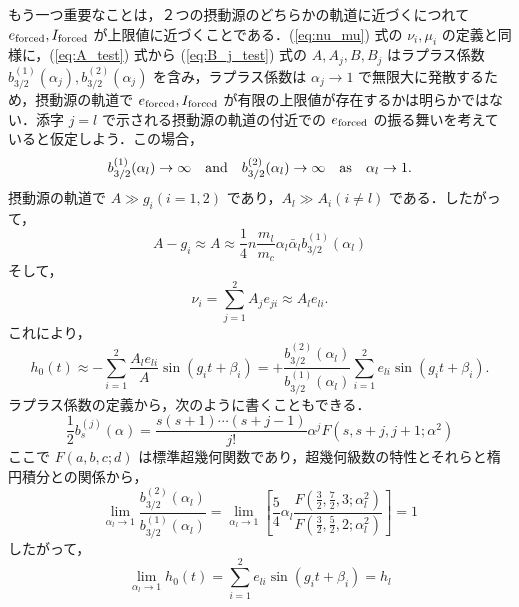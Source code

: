 \documentclass[11pt,a4paper,oneside,onecolumn]{jarticle}
\begin{document}
もう一つ重要なことは，２つの摂動源のどちらかの軌道に近づくにつれて $e_{\rm forced}, I_{\rm forced}$ が上限値に近づくことである．(\ref{eq:nu_mu}) 式の $\nu_i, \mu_i$ の定義と同様に，(\ref{eq:A_test}) 式から (\ref{eq:B_j_test}) 式の $A, A_j, B, B_j$ はラプラス係数 $b_{3/2}^{(1)} (\alpha_j), b_{3/2}^{(2)} (\alpha_j)$ を含み，ラプラス係数は $\alpha_j \rightarrow 1$ で無限大に発散するため，摂動源の軌道で $e_{\rm forced}, I_{\rm forced}$ が有限の上限値が存在するかは明らかではない．添字 $j = l$ で示される摂動源の軌道の付近での $e_{\rm forced}$ の振る舞いを考えていると仮定しよう．この場合，
\begin{equation}
b_{3/2}^{(1)} (\alpha_l) \rightarrow \infty \quad {\rm and} \quad b_{3/2}^{(2)} (\alpha_l) \rightarrow \infty \quad {\rm as} \quad \alpha_l \rightarrow 1.
\end{equation}
摂動源の軌道で $A \gg g_i (i = 1, 2)$ であり，$A_l \gg A_i (i \not= l)$ である．したがって，
\begin{equation}
A - g_i \approx A \approx \frac{1}{4} n \frac{m_l}{m_c} \alpha_l \bar{\alpha}_l b_{3/2}^{(1)} (\alpha_l)
\end{equation}
そして，
\begin{equation}
\nu_i = \sum_{j = 1}^{2} A_j e_{ji} \approx A_l e_{li}.
\end{equation}
これにより，
\begin{equation}
h_0 (t) \approx - \sum_{i = 1}^{2} \frac{A_l e_{li}}{A} \sin (g_i t + \beta_i) = + \frac{b_{3/2}^{(2)} (\alpha_l)}{b_{3/2}^{(1)} (\alpha_l)} \sum_{i = 1}^{2} e_{li} \sin (g_i t + \beta_i).
\end{equation}
ラプラス係数の定義から，次のように書くこともできる．
\begin{equation}
\frac{1}{2} b_{s}^{(j)} (\alpha) = \frac{s (s + 1) \cdots (s + j - 1)}{j !} \alpha^j F (s, s + j, j + 1; \alpha^2)
\end{equation}
ここで $F (a, b, c; d)$ は標準超幾何関数であり，超幾何級数の特性とそれらと楕円積分との関係から，
\begin{equation}
\lim_{\alpha_l \rightarrow 1} \frac{b_{3/2}^{(2)} (\alpha_l)}{b_{3/2}^{(1)} (\alpha_l)} = \lim_{\alpha_l \rightarrow 1} \left[ \frac{5}{4} \alpha_l \frac{F (\frac{3}{2}, \frac{7}{2}, 3; \alpha_l^2)}{F (\frac{3}{2}, \frac{5}{2}, 2; \alpha_l^2)} \right] = 1
\end{equation}
したがって，
\begin{equation}
\lim_{\alpha_l \rightarrow 1} h_0 (t) = \sum_{i = 1}^2 e_{li} \sin (g_i t + \beta_i) = h_l
\end{equation}
\end{document}
